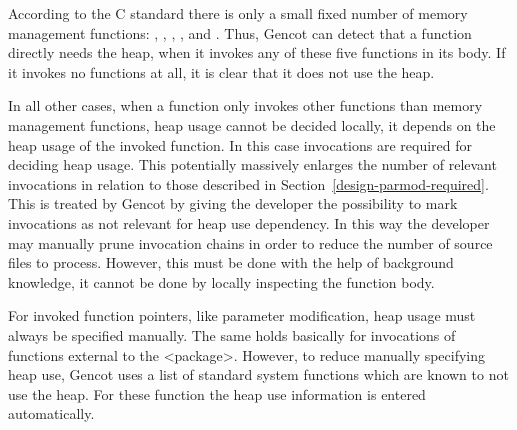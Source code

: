 According to the C standard there is only a small fixed number of memory management functions: , ,
, , and . Thus, Gencot can detect that a function directly needs the heap, when
it invokes any of these five functions in its body. If it invokes no functions at all, it is clear that it does not use 
the heap. 

In all other cases, when a function only invokes other functions than memory management functions, heap usage cannot be
decided locally, it depends on the heap usage of the invoked function. In this case  invocations are required
for deciding heap usage. This potentially massively enlarges the number of relevant invocations in relation to those 
described in Section~\ref{design-parmod-required}. This is treated by Gencot by giving the developer the possibility 
to mark invocations as not relevant for heap use dependency. In this way the developer may manually prune invocation
chains in order to reduce the number of source files to process. However, this must be done with the help of background
knowledge, it cannot be done by locally inspecting the function body.

For invoked function pointers, like parameter modification, heap usage must always be specified manually. The same holds
basically for invocations of functions external to the <package>. However, to reduce manually specifying heap use, Gencot
uses a list of standard system functions which are known to not use the heap. For these function the heap use information
is entered automatically.

